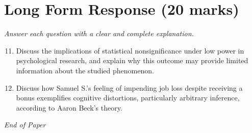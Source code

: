 \documentclass[12pt]{article}
\begin{document}
\section*{Long Form Response (20 marks)}
\textit{Answer each question with a clear and complete explanation.}
\begin{enumerate}[label=\arabic*.]
\setcounter{enumi}{10}
\item Discuss the implications of statistical nonsignificance under low power in psychological research, and explain why this outcome may provide limited information about the studied phenomenon.
\item Discuss how Samuel S.'s feeling of impending job loss despite receiving a bonus exemplifies cognitive distortions, particularly arbitrary inference, according to Aaron Beck's theory.
\end{enumerate}

\vfill
\noindent\textit{End of Paper}
\end{document}
